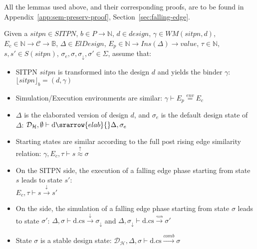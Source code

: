 \documentclass[dvipsnames,12pt]{article}
\begin{document}
\begin{niproof}
  All the lemmas used above, and their corresponding proofs, are to be
  found in Appendix~\ref{app:sem-preserv-proof},
  Section~\ref{sec:falling-edge}.
\end{niproof}

\begin{definition}
  \label{def:fe-hyps}
  Given a $sitpn\in{}SITPN$, $b\in{}P\rightarrow\mathbb{N}$,
  $d\in{}design$, $\gamma\in{}WM(sitpn,d)$,
  $E_c\in\mathbb{N}\rightarrow\mathcal{C}\rightarrow\mathbb{B}$,
  $\Delta\in{}ElDesign$,
  $E_p\in\mathbb{N}\rightarrow{}Ins(\Delta)\rightarrow{}value$,
  $\tau\in\mathbb{N}$, $s,s'\in{}S(sitpn)$,
  $\sigma_e,\sigma,\sigma_\downarrow,\sigma'\in\Sigma$, assume that:
  \begin{itemize}
  \item SITPN $sitpn$ is transformed into the \hvhdl{} design $d$ and
    yields the binder $\gamma$: $\lfloor{}sitpn\rfloor_b=(d,\gamma)$
  \item Simulation/Execution environments are similar:
    $\gamma\vdash{}E_p\stackrel{env}{=}E_c$
  \item $\Delta$ is the elaborated version of design $d$, and
    $\sigma_e$ is the default design state of $\Delta$:
    $\mathcal{D}_\mathcal{H},\emptyset\vdash\mathrm{d}\srarrow{elab}{\fontsize{5}{7}\selectfont}\Delta,\sigma_e$
  \item Starting states are similar according to the full post rising
    edge similarity relation:
    $\gamma,E_c,\tau\vdash{}s\stackrel{\uparrow}{\approx}\sigma$
  \item On the SITPN side, the execution of a falling edge phase
    starting from state $s$ leads to state $s'$:\\
    $E_c,\tau\vdash{}s\xrightarrow{\downarrow}s'$
  \item On the \hvhdl{} side, the simulation of a falling edge phase
    starting from state $\sigma$ leads to state $\sigma'$:
    $\Delta,\sigma\vdash\mathrm{d.cs}\xrightarrow{\downarrow}\sigma_{\downarrow}$
    and
    $\Delta,\sigma_{\downarrow}\vdash\mathrm{d.cs}\xrightarrow{\rightsquigarrow}\sigma'$
  \item State $\sigma$ is a stable design state:
    $\mathcal{D}_{\mathcal{H}},\Delta,\sigma\vdash\mathrm{d.cs}\xrightarrow{comb}\sigma$
  \end{itemize}
\end{definition}

\def\fehyps{For all $sitpn$, $b$, $d$, $\gamma$, $\Delta$, $\sigma_e$,
  $E_c$, $E_p$, $\tau$, $s$, $s'$, $\sigma$, $\sigma_{\downarrow}$,
  $\sigma'$ that verify the hypotheses of
  Definition~\ref{def:fe-hyps},}
\end{document}
